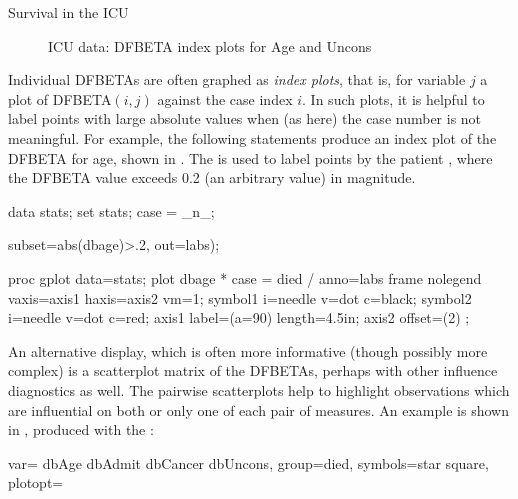 \begin{Example}[icu2]{Survival in the ICU}
\begin{figure}[htb]
\begin{minipage}[t]{.49\linewidth}
 \end{minipage}
 \caption{ICU data: DFBETA index plots for Age and Uncons}\label{fig:icu4b}
\end{figure}
Individual DFBETAs are often graphed as \emph{index plots}, that is,
for variable $j$ a plot of DFBETA$(i, j)$ against the case index $i$.
In such plots, it is helpful to label points with large absolute
values when (as here) the case number is not meaningful.
For example, the following statements produce an index plot of the
DFBETA for age, shown in .
The  is used to label points by the patient ,
where the DFBETA value exceeds 0.2 (an arbitrary value) in magnitude.
\begin{listing}
data stats;
   set stats;
   case = _n_;

    subset=abs(dbage)>.2, out=labs);

proc gplot data=stats;
   plot dbage * case = died /
      anno=labs frame nolegend vaxis=axis1 haxis=axis2 vm=1;
   symbol1 i=needle v=dot c=black;
   symbol2 i=needle v=dot c=red;
   axis1 label=(a=90) length=4.5in;
   axis2 offset=(2) ;
\end{listing}
An alternative display, which is often more informative (though possibly more complex) is a scatterplot matrix of the DFBETAs, perhaps with other
influence diagnostics as well.
The pairwise scatterplots help to highlight observations which are
influential on both or only one of each pair of measures.
An example is shown in , produced with the
:
\begin{listing}
   var= dbAge dbAdmit dbCancer dbUncons, group=died,
   symbols=star square,
   plotopt=%
\end{listing}


\end{Example}
